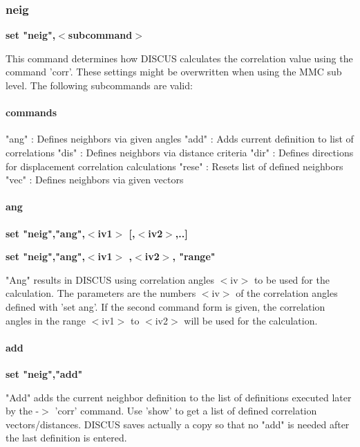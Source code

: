 \subsubsection{neig}
{\bf set "neig",$ <$subcommand$> $ \par }
\par
\vspace{3pt}
This command determines how DISCUS calculates the correlation value 
using the command 'corr'. These settings might be overwritten when 
using the MMC sub level. The following subcommands are valid: 
\par
\paragraph*{commands}
\begin{MacVerbatim}
"ang"  : Defines neighbors via given angles
"add"  : Adds current definition to list of correlations
"dis"  : Defines neighbors via distance criteria
"dir"  : Defines directions for displacement correlation calculations
"rese" : Resets list of defined neighbors
"vec"  : Defines neighbors via given vectors
\end{MacVerbatim}
\paragraph*{ang}
{\bf set "neig","ang",$ <$iv1$> $ [,$ <$iv2$> $,..] \par }
{\bf set "neig","ang",$ <$iv1$> $ ,$ <$iv2$> $, "range" \par }
\par
\vspace{3pt}
"Ang" results in DISCUS using correlation angles $ <$iv$> $ to be used 
for the calculation. The parameters are the numbers $ <$iv$> $ of the 
correlation angles defined with 'set ang'. 
If the second command form is given, the correlation angles in the 
range $ <$iv1$> $ to $ <$iv2$> $ will be used for the calculation. 
\paragraph*{add}
{\bf set "neig","add" \par }
\par
\vspace{3pt}
"Add" adds the current neighbor definition to the list of 
definitions executed later by the -$> $ 'corr' command. Use 'show' 
to get a list of defined correlation vectors/distances. DISCUS saves 
actually a copy so that no "add" is needed after the last definition 
is entered. 
